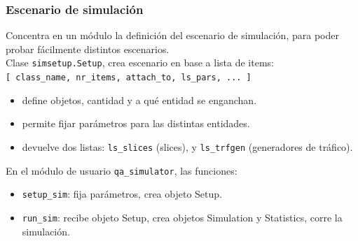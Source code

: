 \documentclass[spanish]{beamer}    %
\begin{document}
\begin{frame}
    \frametitle{Escenario de simulación}
        Concentra en un módulo la definición del escenario de simulación, para poder probar fácilmente distintos escenarios.\\
        Clase \texttt{simsetup.Setup}, crea escenario en base a lista de items:\\
            \vspace{0.2cm}
            \texttt{[ class\_name, nr\_items, attach\_to, ls\_pars, ... ]} 
            \vspace{0.2cm}
            \begin{itemize}
                \item define objetos, cantidad y a qué entidad se enganchan.
                \item permite fijar parámetros para las distintas entidades.
                \item devuelve dos listas: \texttt{ls\_slices} (slices), y \texttt{ls\_trfgen} (generadores de tráfico).
            \end{itemize}
        En el módulo de usuario \texttt{qa\_simulator}, las funciones:
            \begin{itemize}
                \item \texttt{setup\_sim}: fija parámetros, crea objeto Setup.
                \item \texttt{run\_sim}: recibe objeto Setup, crea objetos Simulation y Statistics, corre la simulación. 
            \end{itemize}
\end{frame}

\end{document}
